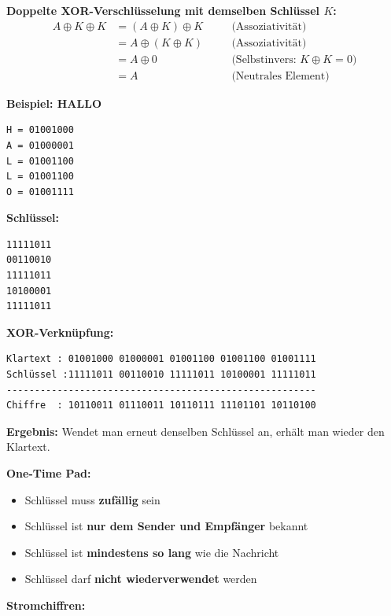 \documentclass[a4paper,12pt]{article}
\begin{document}
\vspace{1em}
\noindent\textbf{Doppelte XOR-Verschlüsselung mit demselben Schlüssel \(K\):}
\begin{align*}
A \oplus K \oplus K 
&= (A \oplus K) \oplus K \quad &&\text{(Assoziativität)} \\
&= A \oplus (K \oplus K) \quad &&\text{(Assoziativität)} \\
&= A \oplus 0 \quad &&\text{(Selbstinvers: $K \oplus K = 0$)} \\
&= A \quad &&\text{(Neutrales Element)}
\end{align*}

\vspace{1em}
\noindent\textbf{Beispiel: HALLO}
\begin{verbatim}
H = 01001000
A = 01000001
L = 01001100
L = 01001100
O = 01001111
\end{verbatim}

\textbf{Schlüssel:}
\begin{verbatim}
11111011
00110010
11111011
10100001
11111011
\end{verbatim}

\textbf{XOR-Verknüpfung:}
\begin{verbatim}
Klartext : 01001000 01000001 01001100 01001100 01001111
Schlüssel :11111011 00110010 11111011 10100001 11111011
-------------------------------------------------------
Chiffre  : 10110011 01110011 10110111 11101101 10110100
\end{verbatim}

\textbf{Ergebnis:}  
Wendet man erneut denselben Schlüssel an, erhält man wieder den Klartext.

\vspace{1em}
\noindent\textbf{One-Time Pad:}
\begin{itemize}
    \item Schlüssel muss \textbf{zufällig} sein
    \item Schlüssel ist \textbf{nur dem Sender und Empfänger} bekannt
    \item Schlüssel ist \textbf{mindestens so lang} wie die Nachricht
    \item Schlüssel darf \textbf{nicht wiederverwendet} werden
\end{itemize}

\noindent\textbf{Stromchiffren:}
\end{document}
